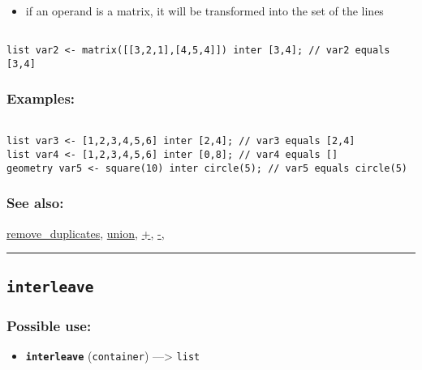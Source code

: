 \documentclass[]{book}
\providecommand{\tightlist}{%
  \setlength{\itemsep}{0pt}\setlength{\parskip}{0pt}}
\theoremstyle{definition}
\theoremstyle{definition}
\theoremstyle{definition}
\theoremstyle{remark}
\begin{document}
\begin{itemize}
\tightlist
\item
  if an operand is a matrix, it will be transformed into the set of the
  lines
\end{itemize}

\begin{verbatim}
 
list var2 <- matrix([[3,2,1],[4,5,4]]) inter [3,4]; // var2 equals [3,4]
\end{verbatim}

\subsubsection{Examples:}\label{examples-210}

\begin{verbatim}
 
list var3 <- [1,2,3,4,5,6] inter [2,4]; // var3 equals [2,4] 
list var4 <- [1,2,3,4,5,6] inter [0,8]; // var4 equals [] 
geometry var5 <- square(10) inter circle(5); // var5 equals circle(5)
\end{verbatim}

\subsubsection{See also:}\label{see-also-119}

\href{OperatorsNR\#remove_duplicates}{remove\_duplicates},
\href{OperatorsSZ\#union}{union}, \href{OperatorsAA\#+}{+},
\href{OperatorsAA\#-}{-},

\begin{center}\rule{0.5\linewidth}{\linethickness}\end{center}

\subsection{\texorpdfstring{\texttt{interleave}}{interleave}}\label{interleave}

\subsubsection{Possible use:}\label{possible-use-278}

\begin{itemize}
\tightlist
\item
  \textbf{\texttt{interleave}} (\texttt{container}) ---\textgreater{}
  \texttt{list}
\end{itemize}
\end{document}
